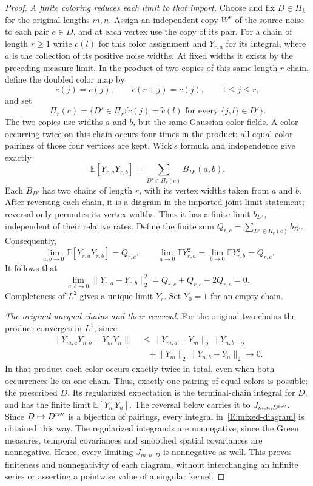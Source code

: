 \documentclass[12pt]{article}
\numberwithin{equation}{section}
\theoremstyle{definition}
\newcommand{\E}{\mathbb{E}}
\begin{document}
\begin{proof}
  \emph{A finite coloring reduces each limit to that import.}
  Choose and fix $D\in\Pi_k$ for the original lengths $m,n$.
  Assign an independent copy $W^e$ of the source noise to each pair
  $e\in D$, and at each vertex use the copy of its pair. For a chain
  of length $r\ge1$ write $c(l)$ for this color assignment and
  $Y_{r,a}$ for its integral, where $a$ is the collection of its positive
  noise widths. At fixed widths it exists by the preceding measure limit.
  In the product of two copies of this same length-$r$ chain, define
  the doubled color map by
  \[
    \widetilde c(j)=c(j),\qquad
    \widetilde c(r+j)=c(j),\qquad 1\le j\le r,
  \]
  and set
  \[
    \Pi_r(c)=\{D'\in\Pi_r:
    \widetilde c(j)=\widetilde c(l)
    \text{ for every }\{j,l\}\in D'\}.
  \]
  The two copies use widths $a$ and $b$, but the same Gaussian color
  fields. A color occurring twice on this chain occurs four times in
  the product; all equal-color pairings of those four vertices are kept.
  Wick's formula
  and independence give exactly
  \[
    \E[Y_{r,a}Y_{r,b}]
    =\sum_{D'\in\Pi_r(c)}B_{D'}(a,b).
  \]
  Each $B_{D'}$ has two chains of length $r$, with its vertex widths
  taken from $a$ and $b$. After reversing each chain, it is a diagram
  in the imported joint-limit statement; reversal only permutes its
  vertex widths. Thus it has a finite limit $b_{D'}$, independent of
  their relative rates. Define the finite sum
  $Q_{r,c}=\sum_{D'\in\Pi_r(c)}b_{D'}$. Consequently,
  \[
    \lim_{a,b\to0}\E[Y_{r,a}Y_{r,b}]=Q_{r,c},\qquad
    \lim_{a\to0}\E Y_{r,a}^2=\lim_{b\to0}\E Y_{r,b}^2=Q_{r,c}.
  \]
  It follows that
  \[
    \lim_{a,b\to0}\|Y_{r,a}-Y_{r,b}\|_2^2
    =Q_{r,c}+Q_{r,c}-2Q_{r,c}=0.
  \]
  Completeness of $L^2$ gives a unique limit $Y_r$. Set $Y_0=1$
  for an empty chain.

  \emph{The original unequal chains and their reversal.}
  For the original two chains the product converges in $L^1$, since
  \[
    \begin{split}
      \|Y_{m,a}Y_{n,b}-Y_mY_n\|_1
      &\le\|Y_{m,a}-Y_m\|_2\|Y_{n,b}\|_2\\
      &\quad+\|Y_m\|_2\|Y_{n,b}-Y_n\|_2\longrightarrow0.
    \end{split}
  \]
  In that product each color occurs exactly twice in total, even when
  both occurrences lie on one chain. Thus, exactly one pairing of equal
  colors is possible: the prescribed $D$. Its regularized expectation
  is the terminal-chain integral for $D$, and has the finite limit
  $\E[Y_mY_n]$. The reversal below carries it to $J_{m,n,D^{\rm rev}}$.
  Since $D\mapsto D^{\rm rev}$ is a bijection of pairings, every
  integral in~\eqref{E:mixed-diagram} is obtained this way.
  The regularized integrands are nonnegative, since the Green measures,
  temporal covariances and smoothed spatial covariances are nonnegative.
  Hence, every limiting $J_{m,n,D}$ is nonnegative as well. This proves
  finiteness and nonnegativity of each diagram, without interchanging
  an infinite series or asserting a pointwise value of a singular kernel.


\end{proof}
\end{document}
